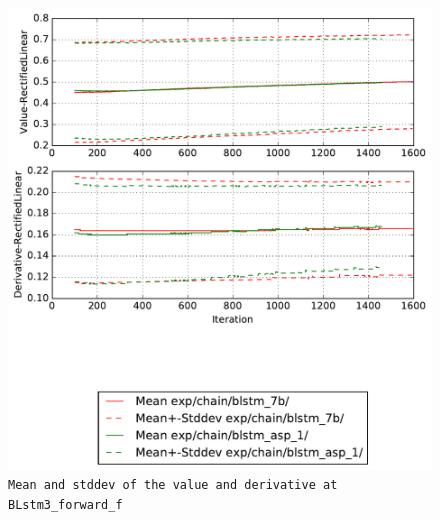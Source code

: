 \documentclass[prl,10pt,twocolumn]{revtex4}
\begin{document}
\newpage
\begin{figure}[h]
  \begin{center}
    \caption{\texttt{Mean and stddev of the value and derivative at BLstm3\_forward\_f}}
    \includegraphics[width=\textwidth]{exp/chain/blstm_7b/report/nonlinstats_BLstm3_forward_f.pdf}
  \end{center}
\end{figure}
\clearpage
\end{document}
